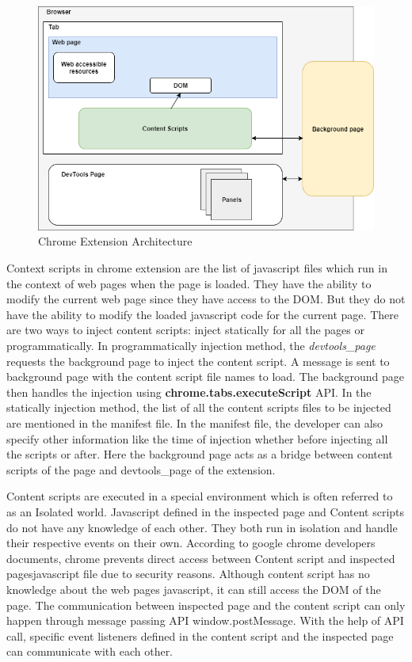 \begin{figure}[!h]
	\centering
	\includegraphics[scale=0.7,trim=0 0 0 0]{images/chrome-extension-architecture.png}
	\caption{Chrome Extension Architecture}
	\label{fig:extension-architecture}
\end{figure}

Context scripts in chrome extension are the list of javascript files which run in the context of web pages when the page is loaded\cite{contentscripts}. They have the ability to modify the current web page since they have access to the DOM. But they do not have the ability to modify the loaded javascript code for the current page. There are two ways to inject content scripts: inject statically for all the pages or programmatically. In programmatically injection method, the \textit{devtools\_page} requests the background page to inject the content script. A message is sent to background page with the content script file names to load. The background page then handles the injection using \textbf{chrome.tabs.executeScript} API. In the statically injection method, the list of all the content scripts files to be injected are mentioned in the manifest file. In the manifest file, the developer can also specify other information like the time of injection whether before injecting all the scripts or after. Here the background page acts as a bridge between content scripts of the page and devtools\_page of the extension.

Content scripts are executed in a special environment which is often referred to as an Isolated world\cite{contentscripts}. Javascript defined in the inspected page and Content scripts do not have any knowledge of each other. They both run in isolation and handle their respective events on their own\cite{contentscripts}. According to google chrome developers documents, chrome prevents direct access between Content script and inspected pages\textquotesingle javascript file due to security reasons. Although content script has no knowledge about the web page\textquotesingle s javascript, it can still access the DOM of the page. The communication between inspected page and the content script can only happen through message passing API window.postMessage\cite{contentscripts}. With the help of API call, specific event listeners defined in the content script and the inspected page can communicate with each other.



